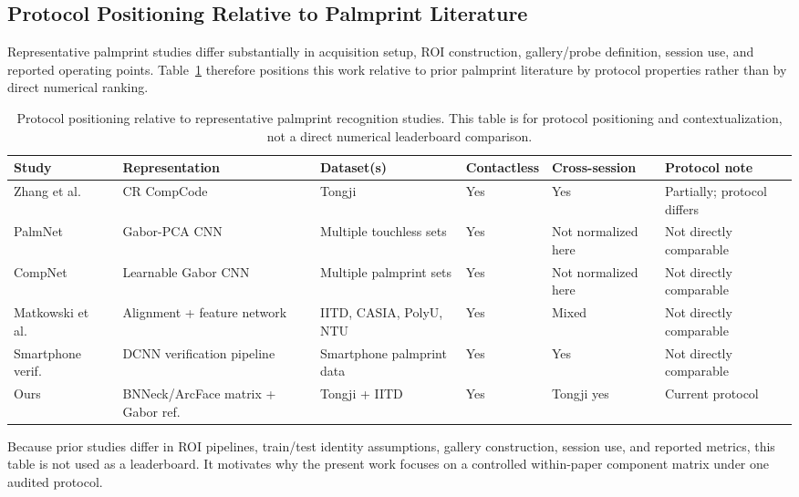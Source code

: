 \subsection{Protocol Positioning Relative to Palmprint Literature}

Representative palmprint studies differ substantially in acquisition setup, ROI construction, gallery/probe definition, session use, and reported operating points. Table~\ref{tab:literature_protocol_positioning} therefore positions this work relative to prior palmprint literature by protocol properties rather than by direct numerical ranking.

\begin{table}[t]
\centering
\caption{Protocol positioning relative to representative palmprint recognition studies. This table is for protocol positioning and contextualization, not a direct numerical leaderboard comparison.}
\label{tab:literature_protocol_positioning}
\scriptsize
\setlength{\tabcolsep}{3pt}
\begin{tabular}{p{}p{}p{}p{}p{}p{}}
\toprule
Study & Representation & Dataset(s) & Contactless & Cross-session & Protocol note \\
\midrule
Zhang et al.~\cite{zhang2017tongji} & CR CompCode & Tongji & Yes & Yes & Partially; protocol differs \\
PalmNet~\cite{genovese2019palmnet} & Gabor-PCA CNN & Multiple touchless sets & Yes & Not normalized here & Not directly comparable \\
CompNet~\cite{liang2021compnet} & Learnable Gabor CNN & Multiple palmprint sets & Yes & Not normalized here & Not directly comparable \\
Matkowski et al.~\cite{matkowski2020uncontrolled} & Alignment + feature network & IITD, CASIA, PolyU, NTU & Yes & Mixed & Not directly comparable \\
Smartphone verif.~\cite{zhang2020smartphone} & DCNN verification pipeline & Smartphone palmprint data & Yes & Yes & Not directly comparable \\
Ours & BNNeck/ArcFace matrix + Gabor ref. & Tongji + IITD & Yes & Tongji yes & Current protocol \\
\bottomrule
\end{tabular}
\end{table}

Because prior studies differ in ROI pipelines, train/test identity assumptions, gallery construction, session use, and reported metrics, this table is not used as a leaderboard. It motivates why the present work focuses on a controlled within-paper component matrix under one audited protocol.
